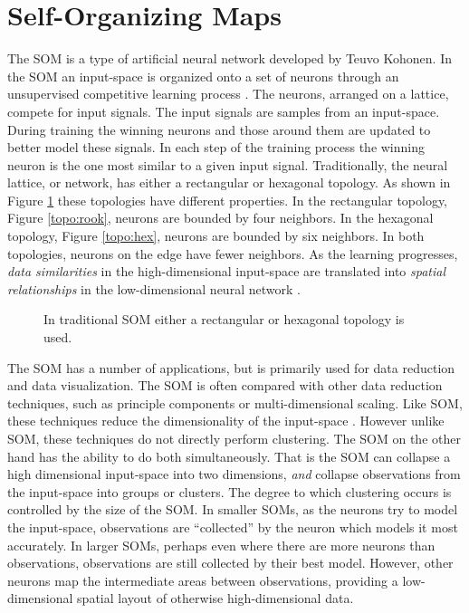 \section{Self-Organizing Maps}
\label{bg:som}
The SOM is a type of artificial neural network developed by Teuvo Kohonen.  In
the SOM an input-space is organized onto a set of neurons through an
unsupervised competitive learning process \citep{Kohonen2000}. The neurons, arranged on a lattice,
compete for input signals.  The input signals are samples from an input-space.
During training the winning neurons and those around them are updated to
better model these signals. In each step of the training process the winning
neuron is the one most similar to a given input signal.  Traditionally, the
neural lattice, or network, has either a rectangular or hexagonal topology.  As shown in
Figure \ref{topos} these topologies have different properties.  In the
rectangular topology, Figure \ref{topo:rook}, neurons are bounded by four
neighbors.  In the hexagonal topology, Figure \ref{topo:hex}, neurons are
bounded by six neighbors.  In both topologies, neurons on the edge have fewer
neighbors.  As the learning progresses, \emph{data similarities} in the
high-dimensional input-space are translated into \emph{spatial relationships}
in the low-dimensional neural network \citep{ritter99}.

\begin{figure}
\centering
{}
\caption{In traditional SOM either a rectangular or hexagonal topology is used.}
\label{topos}
\end{figure}

The SOM has a number of applications, but is primarily used for data reduction
and data visualization.  The SOM is often compared with other data reduction
techniques, such as principle components or multi-dimensional scaling. Like
SOM, these techniques reduce the dimensionality of the input-space
\citep{Kohonen2000,skupin08}. However unlike SOM, these techniques do not
directly perform clustering.  The SOM on the other hand has the ability to do
both simultaneously.  That is the SOM can collapse a high dimensional
input-space into two dimensions, \emph{and} collapse observations from the
input-space into groups or clusters.  The degree to which clustering occurs is
controlled by the size of the SOM.  In smaller SOMs, as the neurons try to
model the input-space, observations are ``collected'' by the neuron which
models it most accurately.  In larger SOMs, perhaps even where there are more
neurons than observations, observations are still collected by their best
model.  However, other neurons map the intermediate areas between
observations, providing a low-dimensional spatial layout of otherwise
high-dimensional data.

